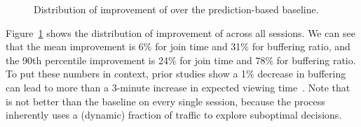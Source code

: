 \begin{figure}[t!]
\captionsetup[subfigure]{justification=centering,farskip=-1pt,captionskip=5pt}
\centering
\caption{Distribution of improvement of \name over the prediction-based baseline.}
\label{fig:eval-overall-quality}
\end{figure}

 Figure~\ref{fig:eval-overall-quality} shows
the distribution of improvement of \name across all sessions.  We can see that
the mean improvement is 6\% for join time and 31\% for buffering ratio, and the
90th percentile improvement is 24\% for join time and 78\% for buffering ratio.
To put these numbers in context, prior studies 
show a 1\% decrease in buffering can lead to more than a 3-minute increase 
in expected viewing time~\cite{sigcomm11}.
Note that \name is not better than the baseline on every single 
session, because the \mab process inherently uses a
(dynamic) fraction of traffic to explore suboptimal decisions.


